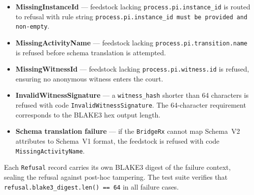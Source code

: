 \begin{itemize}
  \item \textbf{MissingInstanceId} --- feedstock lacking \texttt{process.pi.instance\_id}
    is routed to refusal with rule string
    \texttt{process.pi.instance\_id must be provided and non-empty}.
  \item \textbf{MissingActivityName} --- feedstock lacking
    \texttt{process.pi.transition.name} is refused before schema translation is attempted.
  \item \textbf{MissingWitnessId} --- feedstock lacking \texttt{process.pi.witness.id} is
    refused, ensuring no anonymous witness enters the court.
  \item \textbf{InvalidWitnessSignature} --- a \texttt{witness\_hash} shorter than 64
    characters is refused with code \texttt{InvalidWitnessSignature}. The 64-character
    requirement corresponds to the BLAKE3 hex output length.
  \item \textbf{Schema translation failure} --- if the \texttt{BridgeRx} cannot map
    Schema~V2 attributes to Schema~V1 format, the feedstock is refused with code
    \texttt{MissingActivityName}.
\end{itemize}

Each \texttt{Refusal} record carries its own BLAKE3 digest of the failure context, sealing
the refusal against post-hoc tampering. The test suite verifies that
\texttt{refusal.blake3\_digest.len() == 64} in all failure cases.

